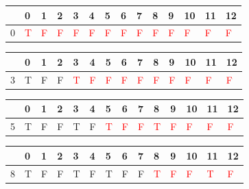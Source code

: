 \documentclass[12pt]{extarticle}
\begin{document}
\begin{center}
\begin{tabular}{| m{0.6cm} | m{0.6cm}| m{0.6cm} | m{0.6cm} | m{0.6cm} | m{0.6cm} | m{0.6cm} | m{0.6cm} | m{0.6cm}| m{0.6cm} | m{0.6cm} | m{0.6cm} | m{0.6cm} | m{0.6cm} |}
 \hline
 & 0 & 1 & 2 & 3 & 4 & 5 & 6 & 7 & 8 & 9 & 10 & 11 & 12\\
 \hline
0 & \textcolor{red}{T} & \textcolor{red}{F} & \textcolor{red}{F} & \textcolor{red}{F} & \textcolor{red}{F} & \textcolor{red}{F} & \textcolor{red}{F} & \textcolor{red}{F} & \textcolor{red}{F} & \textcolor{red}{F} & \textcolor{red}{F} & \textcolor{red}{F} & \textcolor{red}{F}\\
\hline
\end{tabular}
\end{center}

\begin{center}
\begin{tabular}{| m{0.6cm} | m{0.6cm}| m{0.6cm} | m{0.6cm} | m{0.6cm} | m{0.6cm} | m{0.6cm} | m{0.6cm} | m{0.6cm}| m{0.6cm} | m{0.6cm} | m{0.6cm} | m{0.6cm} | m{0.6cm} |}
 \hline
 & 0 & 1 & 2 & 3 & 4 & 5 & 6 & 7 & 8 & 9 & 10 & 11 & 12\\
 \hline
3 & T & F & F & \textcolor{red}{T} & \textcolor{red}{F} & \textcolor{red}{F} & \textcolor{red}{F} & \textcolor{red}{F} & \textcolor{red}{F} & \textcolor{red}{F} & \textcolor{red}{F} & \textcolor{red}{F} & \textcolor{red}{F}\\
\hline
\end{tabular}
\end{center}

\begin{center}
\begin{tabular}{| m{0.6cm} | m{0.6cm}| m{0.6cm} | m{0.6cm} | m{0.6cm} | m{0.6cm} | m{0.6cm} | m{0.6cm} | m{0.6cm}| m{0.6cm} | m{0.6cm} | m{0.6cm} | m{0.6cm} | m{0.6cm} |}
 \hline
 & 0 & 1 & 2 & 3 & 4 & 5 & 6 & 7 & 8 & 9 & 10 & 11 & 12\\
 \hline
5 & T & F & F & T & F & \textcolor{red}{T} & \textcolor{red}{F} & \textcolor{red}{F} & \textcolor{red}{T} & \textcolor{red}{F} & \textcolor{red}{F} & \textcolor{red}{F} & \textcolor{red}{F}\\
\hline
\end{tabular}
\end{center}

\begin{center}
\begin{tabular}{| m{0.6cm} | m{0.6cm}| m{0.6cm} | m{0.6cm} | m{0.6cm} | m{0.6cm} | m{0.6cm} | m{0.6cm} | m{0.6cm}| m{0.6cm} | m{0.6cm} | m{0.6cm} | m{0.6cm} | m{0.6cm} |}
 \hline
 & 0 & 1 & 2 & 3 & 4 & 5 & 6 & 7 & 8 & 9 & 10 & 11 & 12\\
 \hline
8 & T & F & F & T & F & T & F & F & \textcolor{red}{T} & \textcolor{red}{F} & \textcolor{red}{F} & \textcolor{red}{T} & \textcolor{red}{F}\\
\hline
\end{tabular}
\end{center}
\end{document}

